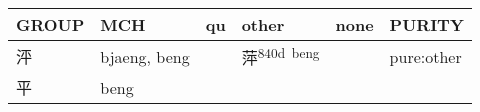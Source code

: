 \documentclass[14pt,a4paper]{scrartcl}
\begin{document}
\begin{longtable}[c]{@{}llllll@{}}
\toprule
\begin{minipage}[b]{0.14\columnwidth}\raggedright\strut
GROUP
\strut\end{minipage} &
\begin{minipage}[b]{0.14\columnwidth}\raggedright\strut
MCH
\strut\end{minipage} &
\begin{minipage}[b]{0.14\columnwidth}\raggedright\strut
qu
\strut\end{minipage} &
\begin{minipage}[b]{0.14\columnwidth}\raggedright\strut
other
\strut\end{minipage} &
\begin{minipage}[b]{0.14\columnwidth}\raggedright\strut
none
\strut\end{minipage} &
\begin{minipage}[b]{0.14\columnwidth}\raggedright\strut
PURITY
\strut\end{minipage}\tabularnewline
\midrule
\endhead
\begin{minipage}[t]{0.14\columnwidth}\raggedright\strut
泙
\strut\end{minipage} &
\begin{minipage}[t]{0.14\columnwidth}\raggedright\strut
bjaeng, beng
\strut\end{minipage} &
\begin{minipage}[t]{0.14\columnwidth}\raggedright\strut
\strut\end{minipage} &
\begin{minipage}[t]{0.14\columnwidth}\raggedright\strut
萍\textsuperscript{840d~beng}
\strut\end{minipage} &
\begin{minipage}[t]{0.14\columnwidth}\raggedright\strut
\strut\end{minipage} &
\begin{minipage}[t]{0.14\columnwidth}\raggedright\strut
pure:other
\strut\end{minipage}\tabularnewline
\begin{minipage}[t]{0.14\columnwidth}\raggedright\strut
平
\strut\end{minipage} &
\begin{minipage}[t]{0.14\columnwidth}\raggedright\strut
beng
\strut\end{minipage} &
\begin{minipage}[t]{0.14\columnwidth}\raggedright\strut
\strut\end{minipage} &

\end{longtable}
\end{document}
